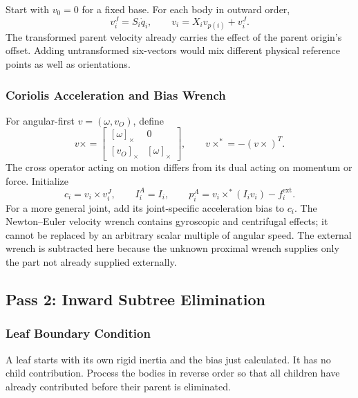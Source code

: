 Start with $v_0=0$ for a fixed base. For each body in outward order,
\begin{equation}
 v_i^J=S_i\dot q_i,\qquad v_i=X_i v_{p(i)}+v_i^J.
\end{equation}
The transformed parent velocity already carries the effect of the parent origin's offset. Adding untransformed six-vectors would mix different physical reference points as well as orientations.

\subsubsection{Coriolis Acceleration and Bias Wrench}
\label{subsubsec:bias_force}

For angular-first $v=(\omega,v_O)$, define
\begin{equation}
 v\times=
 \begin{bmatrix}[\omega]_\times&0\\{[v_O]}_\times&[\omega]_\times\end{bmatrix},
 \qquad v\times^*=-(v\times)^T.
\end{equation}
The cross operator acting on motion differs from its dual acting on momentum or force. Initialize
\begin{equation}
 c_i=v_i\times v_i^J,\qquad I_i^A=I_i,\qquad
 p_i^A=v_i\times^*(I_i v_i)-f_i^{\mathrm{ext}}.
\end{equation}
For a more general joint, add its joint-specific acceleration bias to $c_i$. The Newton--Euler velocity wrench contains gyroscopic and centrifugal effects; it cannot be replaced by an arbitrary scalar multiple of angular speed. The external wrench is subtracted here because the unknown proximal wrench supplies only the part not already supplied externally.

\subsection{Pass 2: Inward Subtree Elimination}
\label{subsec:pass2_inward}

\subsubsection{Leaf Boundary Condition}
\label{subsubsec:leaf_inertia}

A leaf starts with its own rigid inertia and the bias just calculated. It has no child contribution. Process the bodies in reverse order so that all children have already contributed before their parent is eliminated.

